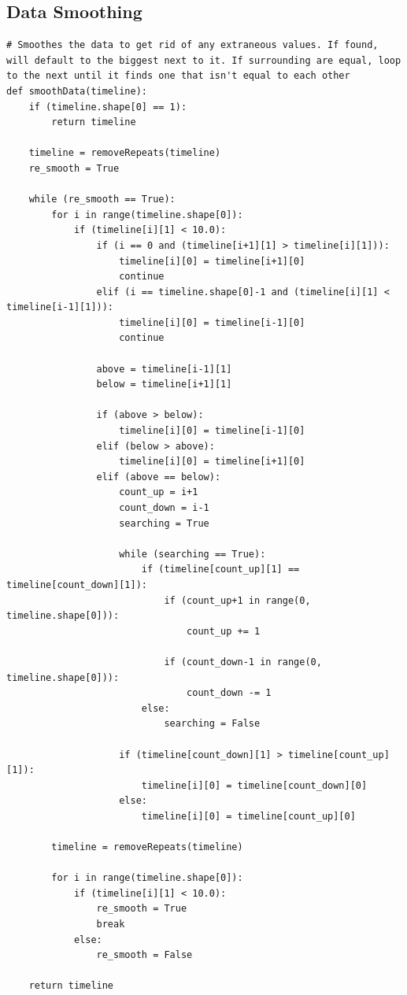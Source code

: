 \documentclass{article}
\begin{document}
\subsection{Data Smoothing}
\label{sec:data}
\begin{lstlisting}
# Smoothes the data to get rid of any extraneous values. If found, will default to the biggest next to it. If surrounding are equal, loop to the next until it finds one that isn't equal to each other
def smoothData(timeline):
	if (timeline.shape[0] == 1):
		return timeline

	timeline = removeRepeats(timeline)
	re_smooth = True

	while (re_smooth == True):
		for i in range(timeline.shape[0]):
			if (timeline[i][1] < 10.0):
				if (i == 0 and (timeline[i+1][1] > timeline[i][1])):
					timeline[i][0] = timeline[i+1][0]
					continue
				elif (i == timeline.shape[0]-1 and (timeline[i][1] < timeline[i-1][1])):
					timeline[i][0] = timeline[i-1][0]
					continue

				above = timeline[i-1][1]
				below = timeline[i+1][1]

				if (above > below):
					timeline[i][0] = timeline[i-1][0]
				elif (below > above):
					timeline[i][0] = timeline[i+1][0]
				elif (above == below):
					count_up = i+1
					count_down = i-1
					searching = True

					while (searching == True):
						if (timeline[count_up][1] == timeline[count_down][1]):
							if (count_up+1 in range(0, timeline.shape[0])):
								count_up += 1

							if (count_down-1 in range(0, timeline.shape[0])):
								count_down -= 1
						else:
							searching = False

					if (timeline[count_down][1] > timeline[count_up][1]):
						timeline[i][0] = timeline[count_down][0]
					else:
						timeline[i][0] = timeline[count_up][0]

		timeline = removeRepeats(timeline)

		for i in range(timeline.shape[0]):
			if (timeline[i][1] < 10.0):
				re_smooth = True
				break
			else:
				re_smooth = False

	return timeline
\end{lstlisting}




\end{document}
